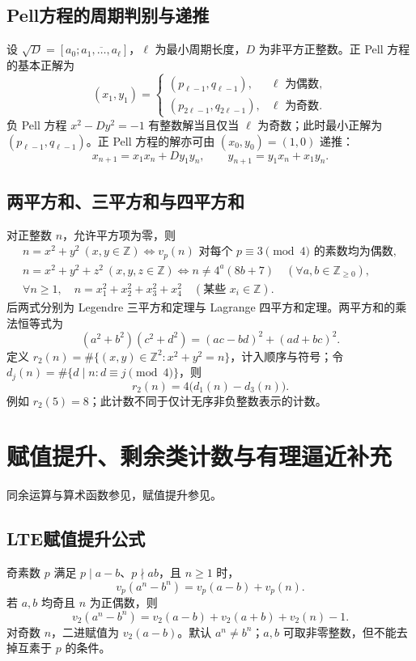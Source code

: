 \documentclass[../main.tex]{subfiles}
\begin{document}
\subsection{Pell方程的周期判别与递推}
设 $\sqrt D=[a_0;\overline{a_1,\ldots,a_\ell}]$，$\ell$ 为最小周期长度，$D$ 为非平方正整数。正 Pell 方程的基本正解为
\[
(x_1,y_1)=\begin{cases}
(p_{\ell-1},q_{\ell-1}),&\ell\text{ 为偶数},\\
(p_{2\ell-1},q_{2\ell-1}),&\ell\text{ 为奇数}.
\end{cases}
\]
负 Pell 方程 $x^2-Dy^2=-1$ 有整数解当且仅当 $\ell$ 为奇数；此时最小正解为 $(p_{\ell-1},q_{\ell-1})$。正 Pell 方程的解亦可由 $(x_0,y_0)=(1,0)$ 递推：
\[
x_{n+1}=x_1x_n+Dy_1y_n,\qquad
y_{n+1}=y_1x_n+x_1y_n.
\]

\subsection{两平方和、三平方和与四平方和}
对正整数 $n$，允许平方项为零，则
\begin{gather*}
n=x^2+y^2\ (x,y\in\mathbb Z)
\iff v_p(n)\text{ 对每个 }p\equiv3\pmod4\text{ 的素数均为偶数},\\
n=x^2+y^2+z^2\ (x,y,z\in\mathbb Z)
\iff n\ne4^a(8b+7)\quad(\forall a,b\in\mathbb Z_{\ge0}),\\
\forall n\ge1,\quad n=x_1^2+x_2^2+x_3^2+x_4^2
\quad(\text{某些 }x_i\in\mathbb Z).
\end{gather*}
后两式分别为 Legendre 三平方和定理与 Lagrange 四平方和定理。两平方和的乘法恒等式为
\[
(a^2+b^2)(c^2+d^2)=(ac-bd)^2+(ad+bc)^2.
\]
定义 $r_2(n)=\#\{(x,y)\in\mathbb Z^2:x^2+y^2=n\}$，计入顺序与符号；令 $d_j(n)=\#\{d\mid n:d\equiv j\pmod4\}$，则
\[
r_2(n)=4\bigl(d_1(n)-d_3(n)\bigr).
\]
例如 $r_2(5)=8$；此计数不同于仅计无序非负整数表示的计数。
\section{赋值提升、剩余类计数与有理逼近补充}
同余运算与算术函数参见\cite{shoup,dlmf}，赋值提升参见\cite{lte}。
\subsection{LTE赋值提升公式}
奇素数 $p$ 满足 $p\mid a-b$、$p\nmid ab$，且 $n\ge1$ 时，
\[
v_p(a^n-b^n)=v_p(a-b)+v_p(n).
\]
若 $a,b$ 均奇且 $n$ 为正偶数，则
\[
v_2(a^n-b^n)=v_2(a-b)+v_2(a+b)+v_2(n)-1.
\]
对奇数 $n$，二进赋值为 $v_2(a-b)$。默认 $a^n\ne b^n$；$a,b$ 可取非零整数，但不能去掉互素于 $p$ 的条件。
\end{document}
